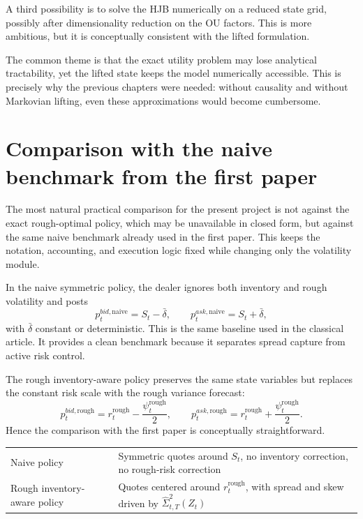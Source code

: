\documentclass[a4paper,10pt,titlepage,oneside,openany]{book}
\theoremstyle{plain}
\theoremstyle{definition}
\theoremstyle{remark}
\newcommand{\1}{\mathbf{1}}
\begin{document}
A third possibility is to solve the HJB numerically on a reduced state grid, possibly after dimensionality reduction on the OU factors. This is more ambitious, but it is conceptually consistent with the lifted formulation.

The common theme is that the exact utility problem may lose analytical tractability, yet the lifted state keeps the model numerically accessible. This is precisely why the previous chapters were needed: without causality and without Markovian lifting, even these approximations would become cumbersome.

\section{Comparison with the naive benchmark from the first paper}

The most natural practical comparison for the present project is not against the exact rough-optimal policy, which may be unavailable in closed form, but against the same naive benchmark already used in the first paper. This keeps the notation, accounting, and execution logic fixed while changing only the volatility module.

In the naive symmetric policy, the dealer ignores both inventory and rough volatility and posts
\[
p_t^{bid,\mathrm{naive}} = S_t-\bar\delta,
\qquad
p_t^{ask,\mathrm{naive}} = S_t+\bar\delta,
\]
with \(\bar\delta\) constant or deterministic. This is the same baseline used in the classical article. It provides a clean benchmark because it separates spread capture from active risk control.

The rough inventory-aware policy preserves the same state variables but replaces the constant risk scale with the rough variance forecast:
\[
p_t^{bid,\mathrm{rough}} = r_t^{\mathrm{rough}}-\frac{\psi_t^{\mathrm{rough}}}{2},
\qquad
p_t^{ask,\mathrm{rough}} = r_t^{\mathrm{rough}}+\frac{\psi_t^{\mathrm{rough}}}{2}.
\]
Hence the comparison with the first paper is conceptually straightforward.

\begin{center}
\begin{tabularx}{\textwidth}{@{}lX@{}}
\toprule
Naive policy & Symmetric quotes around \(S_t\), no inventory correction, no rough-risk correction \\
Rough inventory-aware policy & Quotes centered around \(r_t^{\mathrm{rough}}\), with spread and skew driven by \(\widehat{\Sigma}_{t,T}^2(Z_t)\) \\
\bottomrule
\end{tabularx}
\end{center}
\end{document}
